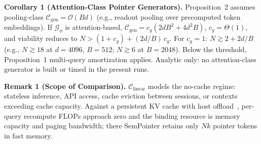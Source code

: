 \documentclass[runningheads]{llncs}
\begin{document}
{\vspace{0.3em}
\noindent\textbf{Corollary 1 (Attention-Class Pointer Generators).} Proposition~2 assumes pooling-class $\mathcal{C}_{\mathrm{gen}}=\mathcal{O}(Bd)$ (e.g., readout pooling over precomputed token embeddings). If $\mathcal{G}_\phi$ is attention-based, $\mathcal{C}_{\mathrm{gen}} = c_g(2dB^2 + 4d^2B)$, $c_g=\Theta(1)$, and viability reduces to $N > (1+c_g) + (2d/B)\,c_g$. For $c_g=1$: $N \gtrsim 2 + 2d/B$ (e.g., $N \gtrsim 18$ at $d{=}4096$, $B{=}512$; $N \gtrsim 6$ at $B{=}2048$). Below the threshold, Proposition~1 multi-query amortization applies. Analytic only: no attention-class generator is built or timed in the present runs.

\vspace{0.5em}
\noindent\textbf{Remark 1 (Scope of Comparison).} $\mathcal{C}_{\mathrm{linear}}$ models the no-cache regime: stateless inference, API access, cache eviction
between sessions, or contexts exceeding cache capacity. Against a
persistent KV cache with host offload~\cite{kwon2023pagedattention}, per-query recompute FLOPs
approach zero and the binding resource is memory capacity and paging
bandwidth; there SemPointer retains only $Nk$ pointer tokens in fast memory.

}
\end{document}

